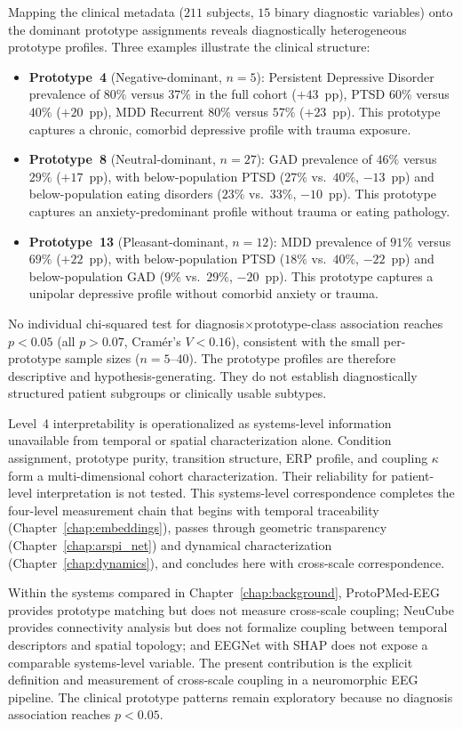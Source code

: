 Mapping the clinical metadata ($211$ subjects, $15$ binary diagnostic variables) onto the dominant prototype assignments reveals diagnostically heterogeneous prototype profiles. Three examples illustrate the clinical structure:
\begin{itemize}
    \item \textbf{Prototype~4} (Negative-dominant, $n = 5$): Persistent Depressive Disorder prevalence of $80\%$ versus $37\%$ in the full cohort ($+43$~pp), PTSD $60\%$ versus $40\%$ ($+20$~pp), MDD Recurrent $80\%$ versus $57\%$ ($+23$~pp). This prototype captures a chronic, comorbid depressive profile with trauma exposure.
    \item \textbf{Prototype~8} (Neutral-dominant, $n = 27$): GAD prevalence of $46\%$ versus $29\%$ ($+17$~pp), with below-population PTSD ($27\%$ vs.\ $40\%$, $-13$~pp) and below-population eating disorders ($23\%$ vs.\ $33\%$, $-10$~pp). This prototype captures an anxiety-predominant profile without trauma or eating pathology.
    \item \textbf{Prototype~13} (Pleasant-dominant, $n = 12$): MDD prevalence of $91\%$ versus $69\%$ ($+22$~pp), with below-population PTSD ($18\%$ vs.\ $40\%$, $-22$~pp) and below-population GAD ($9\%$ vs.\ $29\%$, $-20$~pp). This prototype captures a unipolar depressive profile without comorbid anxiety or trauma.
\end{itemize}
No individual chi-squared test for diagnosis$\times$prototype-class association reaches $p < 0.05$ (all $p > 0.07$, Cram\'{e}r's $V < 0.16$), consistent with the small per-prototype sample sizes ($n = 5$--$40$). The prototype profiles are therefore descriptive and hypothesis-generating. They do not establish diagnostically structured patient subgroups or clinically usable subtypes.

Level~4 interpretability is operationalized as systems-level information unavailable from temporal or spatial characterization alone. Condition assignment, prototype purity, transition structure, ERP profile, and coupling $\kappa$ form a multi-dimensional cohort characterization. Their reliability for patient-level interpretation is not tested. This systems-level correspondence completes the four-level measurement chain that begins with temporal traceability (Chapter~\ref{chap:embeddings}), passes through geometric transparency (Chapter~\ref{chap:arspi_net}) and dynamical characterization (Chapter~\ref{chap:dynamics}), and concludes here with cross-scale correspondence.

Within the systems compared in Chapter~\ref{chap:background}, ProtoPMed-EEG \cite{barnett_protopmed_2024} provides prototype matching but does not measure cross-scale coupling; NeuCube \cite{kasabov_neucube_2014} provides connectivity analysis but does not formalize coupling between temporal descriptors and spatial topology; and EEGNet with SHAP does not expose a comparable systems-level variable. The present contribution is the explicit definition and measurement of cross-scale coupling in a neuromorphic EEG pipeline. The clinical prototype patterns remain exploratory because no diagnosis association reaches $p < 0.05$.

